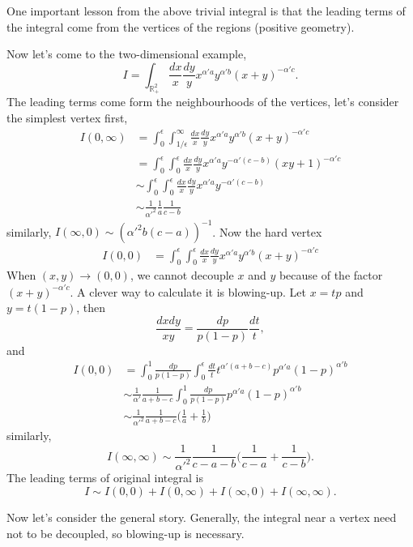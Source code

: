 \documentclass[12pt]{article}
\theoremstyle{definition}
\theoremstyle{plain}
\begin{document}
One important lesson from the above trivial integral is that the leading terms of the integral come from the vertices of the regions (positive geometry). 

Now let's come to the two-dimensional example,
\[
	I=\int_{\mathbb R_+^2} \frac{dx}{x}\frac{dy}{y}x^{\alpha' a}y^{\alpha' b}(x+y)^{-\alpha' c}.
\]
The leading terms come form the neighbourhoods of the vertices, let's consider the simplest vertex first, 
\begin{align*}
	I(0,\infty)&=\int_{0}^\epsilon\int_{1/\epsilon}^\infty \frac{dx}{x}\frac{dy}{y}x^{\alpha' a}y^{\alpha' b}(x+y)^{-\alpha' c}\\
	&=
	\int_{0}^\epsilon\int^{\epsilon}_0 \frac{dx}{x}\frac{dy}{y}x^{\alpha' a}y^{-\alpha' (c-b)}(xy+1)^{-\alpha' c}\\
	&\sim 
	\int_{0}^\epsilon\int^{\epsilon}_0 \frac{dx}{x}\frac{dy}{y}x^{\alpha' a}y^{-\alpha' (c-b)}\\
	&\sim 
	\frac{1}{{\alpha'}^2}\frac{1}{a} \frac{1}{c-b}
\end{align*}
similarly, $I(\infty,0)\sim ({\alpha'}^2 b (c-a))^{-1}$. Now the hard vertex
\begin{align*}
	I(0,0)&=\int_{0}^\epsilon\int_0^{\epsilon} \frac{dx}{x}\frac{dy}{y}x^{\alpha' a}y^{\alpha' b}(x+y)^{-\alpha' c}
\end{align*}
When $(x,y)\to (0,0)$, we cannot decouple $x$ and $y$ because of the factor $(x+y)^{-\alpha' c}$. A clever way to calculate it is blowing-up. Let $x = tp$ and $y=t(1-p)$, then
\[
	\frac{dxdy}{xy} = \frac{dp}{p(1-p)}\frac{dt}{t},
\]
and
\begin{align*}
	I(0,0)&=\int_0^{1}\frac{dp}{p(1-p)}\int_{0}^\epsilon\frac{dt}{t} t^{\alpha'(a+b-c)}p^{\alpha' a}(1-p)^{\alpha' b}\\
	&\sim \frac{1}{\alpha'}\frac{1}{a+b-c}\int_0^{1}\frac{dp}{p(1-p)}p^{\alpha' a}(1-p)^{\alpha' b}\\
	&\sim \frac{1}{{\alpha'}^2}\frac{1}{a+b-c}\biggl(\frac 1a+\frac 1b\biggr)
\end{align*}
similarly, 
\[
	I(\infty,\infty)\sim \frac{1}{{\alpha'}^2}\frac{1}{c-a-b}\biggl(\frac 1{c-a}+\frac 1{c-b}\biggr).
\]
The leading terms of original integral is 
\[
	I\sim I(0,0)+I(0,\infty)+I(\infty,0)+I(\infty,\infty).
\]

Now let's consider the general story. Generally, the integral near a vertex need not to be decoupled, so blowing-up is necessary. 
\end{document}
